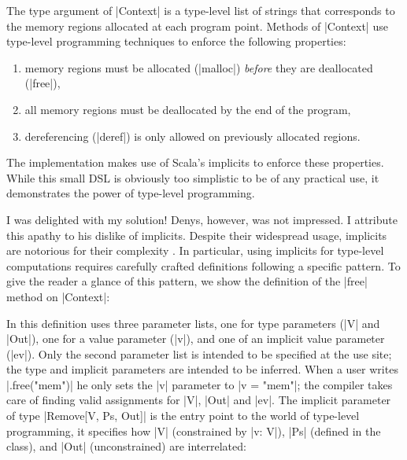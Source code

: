 \memImplicitMainCodeSection

\noindent
The type argument of |Context| is a type-level list of strings that corresponds to the memory regions allocated at each program point.
Methods of |Context| use type-level programming techniques to enforce the following properties:

\begin{enumerate}
  \item memory regions must be allocated (|malloc|) \emph{before} they are deallocated (|free|),
  \item all memory regions must be deallocated by the end of the program,
  \item dereferencing (|deref|) is only allowed on previously allocated regions.
\end{enumerate}

\noindent
The implementation makes use of Scala's implicits to enforce these properties.
While this small DSL is obviously too simplistic to be of any practical use, it demonstrates the power of type-level programming.

I was delighted with my solution!
Denys, however, was not impressed.
I attribute this apathy to his dislike of implicits.
Despite their widespread usage, implicits are notorious for their complexity \citep{filip2019implicits}.
In particular, using implicits for type-level computations requires carefully crafted definitions following a specific pattern.
To give the reader a glance of this pattern, we show the definition of the |free| method on |Context|:

\memImplicitContextCodeSection

In this definition uses three parameter lists, one for type parameters (|V| and |Out|), one for a value parameter (|v|), and one of an implicit value parameter (|ev|).
Only the second parameter list is intended to be specified at the use site; the type and implicit parameters are intended to be inferred.
When a user writes |.free("mem")| he only sets the |v| parameter to |v = "mem"|; the compiler takes care of finding valid assignments for |V|, |Out| and |ev|.
The implicit parameter of type |Remove[V, Ps, Out]| is the entry point to the world of type-level programming, it specifies how |V| (constrained by |v: V|), |Ps| (defined in the class), and |Out| (unconstrained) are interrelated:

